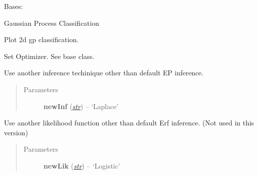 \documentclass[letterpaper,10pt,english]{sphinxmanual}
\begin{document}
\begin{fulllineitems}
\label{pyGPs.Core:pyGPs.Core.gp.GPC}
Bases: {\hyperref[pyGPs.Core:pyGPs.Core.gp.GP]{}}

Gaussian Process Classification

\begin{fulllineitems}
\label{pyGPs.Core:pyGPs.Core.gp.GPC.plot}
Plot 2d gp classification.

\end{fulllineitems}


\begin{fulllineitems}
\label{pyGPs.Core:pyGPs.Core.gp.GPC.setOptimizer}
Set Optimizer. See base class.

\end{fulllineitems}


\begin{fulllineitems}
\label{pyGPs.Core:pyGPs.Core.gp.GPC.useInference}
Use another inference techinique other than default EP inference.
\begin{quote}\begin{description}
\item[{Parameters}] \leavevmode
\textbf{newInf} (\href{http://docs.python.org/library/functions.html\#str}{\emph{str}}) -- `Laplace'

\end{description}\end{quote}

\end{fulllineitems}


\begin{fulllineitems}
\label{pyGPs.Core:pyGPs.Core.gp.GPC.useLikelihood}
Use another likelihood function other than default Erf inference.
(Not used in this version)
\begin{quote}\begin{description}
\item[{Parameters}] \leavevmode
\textbf{newLik} (\href{http://docs.python.org/library/functions.html\#str}{\emph{str}}) -- `Logistic'

\end{description}\end{quote}

\end{fulllineitems}


\end{fulllineitems}
\end{document}

